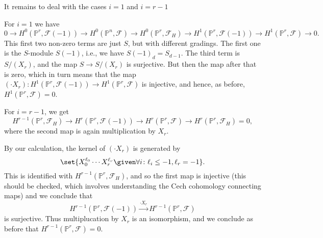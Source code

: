 It remains to deal with the cases $i = 1$ and $i = r-1$

For $i = 1$ we have
\[ 0\to H^0(\mathbb{P}^r, \mathcal{F}(-1))\to H^0(\mathbb{P}^n, \mathcal{F})\to H^0(\mathbb{P}^r, \mathcal{F}_H)\to H^1(\mathbb{P}^r, \mathcal{F}(-1))\to H^1(\mathbb{P}^r, \mathcal{F})\to 0. \]
This first two non-zero terms are just $S$, but with different gradings. The first
one is the $S$-module $S(-1)$, i.e., we have $S(-1)_d = S_{d-1}$. The third term is $S/(X_r)$,
and the map $S\to S/(X_r)$ is surjective. But then the map after that is zero, which in turn
means that the map $(\cdot X_r)\colon H^1(\mathbb{P}^r, \mathcal{F}(-1))\to H^1(\mathbb{P}^r, \mathcal{F})$
is injective, and hence, as before, $H^1(\mathbb{P}^r, \mathcal{F}) = 0$.

For $i = r-1$, we get
\[ H^{r-1}(\mathbb{P}^r, \mathcal{F}_H)\to H^r(\mathbb{P}^r, \mathcal{F}(-1))\to H^r(\mathbb{P}^r, \mathcal{F})\to H^r(\mathbb{P}^r, \mathcal{F}_H) = 0, \]
where the second map is again multiplication by $X_r$.

By our calculation, the kernel of $(\cdot X_r)$ is generated by
\[ \set{X_0^{\ell_0}\cdots X_r^{\ell_r}\given \forall i\colon \ell_i\leq -1, \ell_r = -1}. \]
This is identified with $H^{r-1}(\mathbb{P}^r, \mathcal{F}_H)$, and so the first
map is injective (this should be checked, which involves understanding the Cech
cohomology connecting maps) and we conclude that
\[ H^{r-1}(\mathbb{P}^r, \mathcal{F}(-1))\stackrel{\cdot X_r}{\longrightarrow} H^{r-1}(\mathbb{P}^r, \mathcal{F}) \]
is surjective. Thus multiplucation by $X_r$ is an isomorphism, and we conclude as before
that $H^{r-1}(\mathbb{P}^r, \mathcal{F}) = 0$.

